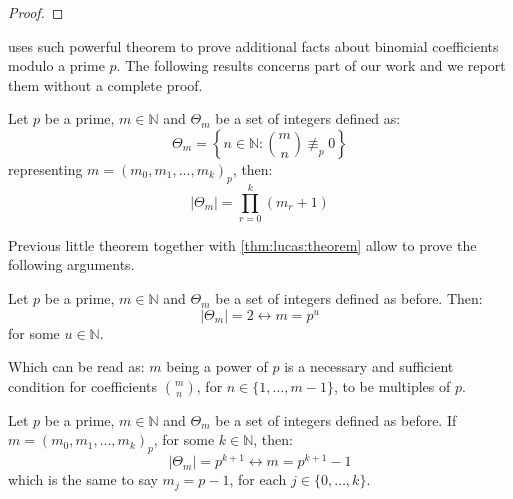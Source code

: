 \begin{proof}
\end{proof}

\citeauthor{fine:1947} uses such powerful theorem to prove additional facts
about binomial coefficients modulo a prime $p$. The following results concerns
part of our work and we report them without a complete proof.

\begin{theorem}
    Let $p$ be a prime, $m\in\mathbb{N}$ and $\Theta_{m}$ be a set of integers defined as: 
    \begin{displaymath}
        \Theta_{m}=\left\lbrace n\in\mathbb{N}: 
            {{m}\choose{n}}\not\equiv_{p}0\right\rbrace
    \end{displaymath}
    representing $m=\left(m_{0},m_{1},\ldots,m_{k}\right)_{p}$, then:
    \begin{displaymath}
        \left|\Theta_{m}\right|=\prod_{r=0}^{k}{(m_{r}+1)}
    \end{displaymath}
    \label{thm:fine:divisibility:binomial:coeffs:on:row}
\end{theorem}

Previous little theorem together with \autoref{thm:lucas:theorem} 
allow \citeauthor{fine:1947} to prove the following arguments.

\begin{theorem}
    Let $p$ be a prime, $m\in\mathbb{N}$ and $\Theta_{m}$ 
    be a set of integers defined as before. Then:   
    \begin{displaymath}
        \left|\Theta_{m}\right|=2\leftrightarrow m=p^{u}
    \end{displaymath}
    for some $u\in\mathbb{N}$.
\end{theorem}

Which can be read as: \flqq $m$ being a power of $p$ is a necessary and 
sufficient condition for coefficients ${{m}\choose{n}}$, for $n\in\lbrace1,\ldots,m-1\rbrace$, 
    to be multiples of $p$\frqq.
\begin{theorem}
    Let $p$ be a prime, $m\in\mathbb{N}$ and $\Theta_{m}$ 
    be a set of integers defined as before.
    If $m=\left(m_{0},m_{1},\ldots,m_{k}\right)_{p}$, for some $k\in\mathbb{N}$, then:
    \begin{displaymath}
        \left|\Theta_{m}\right|=p^{k+1}\leftrightarrow m=p^{k+1}-1
    \end{displaymath}
    which is the same to say $m_{j}=p-1$, for each $j\in\lbrace 0,\ldots,k\rbrace$.
\end{theorem}

